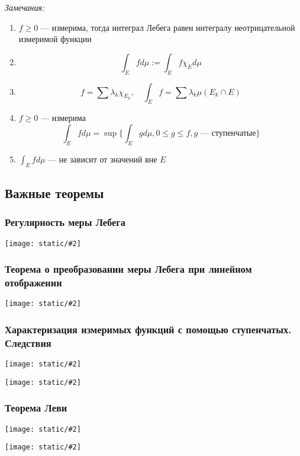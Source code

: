 \documentclass{article}
\def\images#1#2{\begin{center}\texttt{[image: static/\#2]}\end{center}}
\begin{document}
\textit{Замечания: }
\begin{enumerate}
    \item $f \ge 0$ --- измерима, тогда интеграл Лебега равен интегралу неотрицательной измеримой функции
    \item \[\int_{E} f d \mu := \int_{E} f \chi_{E} d \mu\]
    \item \[f = \sum \lambda_{k} \chi_{E_{k}}, \quad \int_{E} f = \sum \lambda_k \mu(E_{k} \cap E)\]
    \item $f \ge 0$ --- измерима
        \[\int_{E} f d \mu = \sup \{\int_{E} g d \mu, 0 \le g \le f, g\text{ --- ступенчатые}\}\]
    \item $\int_{E} f d \mu$ --- не зависит от значений вне $E$
\end{enumerate}

\newpage

\subsection{Важные теоремы}

\subsubsection{Регулярность меры Лебега}

\images{0.95}{reg_mer_leb.jpg}

\subsubsection{Теорема о преобразовании меры Лебега при линейном отображении}

\images{0.95}{iz_lin_otob.jpg}

\subsubsection{Характеризация измеримых функций с помощью ступенчатых. Следствия}

\images{0.95}{harakt_iz_st_1.jpg}

\images{1}{harakt_iz_st_2.jpg}

\subsubsection{Теорема Леви}

\images{0.95}{t_levi_1.jpg}

\images{1}{t_levi_2.jpg}


\newpage
\end{document}
